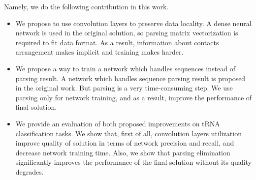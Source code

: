 Namely, we do the following contribution in this work.
\begin{itemize}
\item We propose to use convolution layers to preserve data locality. 
A dense neural network is used in the original solution, so parsing matrix vectorization is required to fit data format. 
As a result, information about contacts arrangement makes implicit and training makes harder.
\item  We propose a way to train a network which handles sequences instead of parsing result.
A network which handles sequence parsing result is proposed in the original work. But parsing is a very time-consuming step. 
We use parsing only for network training, and as a result, improve the performance of final solution.
\item We provide an evaluation of both proposed improvements on tRNA classification tasks. 
We show that, first of all, convolution layers utilization improve quality of solution in terms of network precision and recall, and decrease network training time.
Also, we show that parsing elimination significantly improves the performance of the final solution without its quality degrades.
\end{itemize}